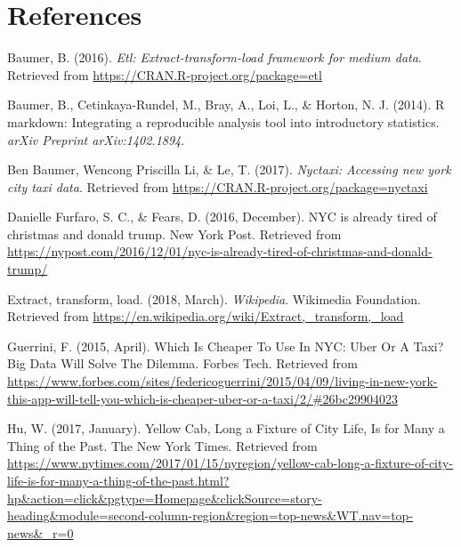 \documentclass[12pt,twoside]{reedthesis}
\theoremstyle{definition}
\theoremstyle{definition}
\theoremstyle{definition}
\theoremstyle{remark}
\begin{document}
\backmatter

\chapter*{References}\label{references}


\noindent

\setlength{\parindent}{-0.20in} \setlength{\leftskip}{0.20in}
\setlength{\parskip}{8pt}

\hypertarget{refs}{}
\hypertarget{ref-pkgetl}{}
Baumer, B. (2016). \emph{Etl: Extract-transform-load framework for
medium data}. Retrieved from
\url{https://CRAN.R-project.org/package=etl}

\hypertarget{ref-baumer2014}{}
Baumer, B., Cetinkaya-Rundel, M., Bray, A., Loi, L., \& Horton, N. J.
(2014). R markdown: Integrating a reproducible analysis tool into
introductory statistics. \emph{arXiv Preprint arXiv:1402.1894}.

\hypertarget{ref-pkgnyctaxi}{}
Ben Baumer, Wencong Priscilla Li, \& Le, T. (2017). \emph{Nyctaxi:
Accessing new york city taxi data}. Retrieved from
\url{https://CRAN.R-project.org/package=nyctaxi}

\hypertarget{ref-furfaro2016}{}
Danielle Furfaro, S. C., \& Fears, D. (2016, December). NYC is already
tired of christmas and donald trump. New York Post. Retrieved from
\url{https://nypost.com/2016/12/01/nyc-is-already-tired-of-christmas-and-donald-trump/}

\hypertarget{ref-wikipedia}{}
Extract, transform, load. (2018, March). \emph{Wikipedia}. Wikimedia
Foundation. Retrieved from
\url{https://en.wikipedia.org/wiki/Extract,_transform,_load}

\hypertarget{ref-guerrini2015}{}
Guerrini, F. (2015, April). Which Is Cheaper To Use In NYC: Uber Or A
Taxi? Big Data Will Solve The Dilemma. Forbes Tech. Retrieved from
\url{https://www.forbes.com/sites/federicoguerrini/2015/04/09/living-in-new-york-this-app-will-tell-you-which-is-cheaper-uber-or-a-taxi/2/\#26bc29904023}

\hypertarget{ref-hu2017}{}
Hu, W. (2017, January). Yellow Cab, Long a Fixture of City Life, Is for
Many a Thing of the Past. The New York Times. Retrieved from
\url{https://www.nytimes.com/2017/01/15/nyregion/yellow-cab-long-a-fixture-of-city-life-is-for-many-a-thing-of-the-past.html?hp\&action=click\&pgtype=Homepage\&clickSource=story-heading\&module=second-column-region\&region=top-news\&WT.nav=top-news\&_r=0}
\end{document}
